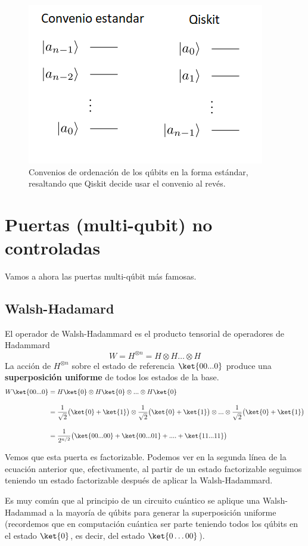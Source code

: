 \documentclass[a4paper,11pt]{book} %
\numberwithin{equation}{chapter}
\begin{document}
	\begin{figure}[H]
	\centering 
	\includegraphics[width=0.4\linewidth]{Figuras/Fig_multiqubits_convenios_ordenacion}
	\caption{Convenios de ordenación de los qúbits en la forma estándar, resaltando que Qiskit decide usar el convenio al revés.}
	\label{Fig_multiqubits_convenios_ordenacion}
	\end{figure}


    \section{Puertas (multi-qubit) no controladas}

Vamos a ahora las puertas multi-qúbit más famosas.
   

        \subsection{Walsh-Hadamard}
        
El operador de Walsh-Hadammard es el producto tensorial de operadores de Hadammard
$$
W = H^{\otimes n} = H\otimes H \ldots \otimes H 
$$
La  acción  de $H^{\otimes n}$ sobre el estado de referencia $\ket{00...0}$ produce una \textbf{superposición uniforme} de todos los estados de la base.
	\begin{align*}
	W \ket{00...0} &= H\ket{0}\otimes H\ket{0} \otimes ... \otimes H\ket{0} \\  \rule{0mm}{8mm}
	& = \frac{1}{\sqrt{2}}\big(\ket{0}+\ket{1}\big)\otimes \frac{1}{\sqrt{2}}\big(\ket{0}+\ket{1}\big)\otimes ...\otimes \frac{1}{\sqrt{2}}\big(\ket{0}+\ket{1}\big)\\ \rule{0mm}{8mm}
	&= \frac{1}{2^{n/2}}\big(\ket{00...00} + \ket{00...01}+....+\ket{11...11} \big)
	\end{align*}



Vemos que esta puerta es factorizable. Podemos ver en la segunda línea de la ecuación anterior que, efectivamente, al partir de un estado factorizable seguimos teniendo un estado factorizable después de aplicar la Walsh-Hadammard. 

Es muy común que al principio de un circuito cuántico se aplique una Walsh-Hadammad a la mayoría de qúbits para generar la superposición uniforme (recordemos que en computación cuántica ser parte teniendo todos los qúbits en el estado $\ket{0}$, es decir, del estado $\ket{0\dots00}$).
\end{document}
